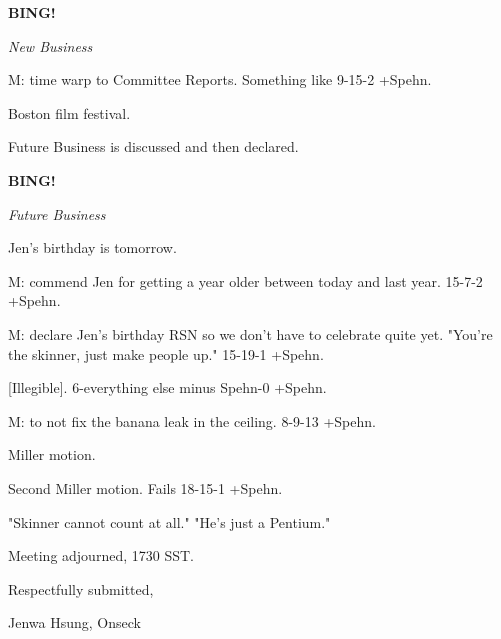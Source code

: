 \documentclass[12pt]{article}
\newcommand{\bing}{{\bf BING!} }
\newcommand{\goto}[1]{\bing \vskip 12pt \centerline{{\em{#1}}}}
\begin{document}
\goto{New Business}

M: time warp to Committee Reports. Something like 9-15-2 +Spehn.

Boston film festival.

Future Business is discussed and then declared.

\goto{Future Business}

Jen's birthday is tomorrow.

M: commend Jen for getting a year older between today and last year. 15-7-2 +Spehn.

M: declare Jen's birthday RSN so we don't have to celebrate quite yet. "You're the skinner, just make people up." 15-19-1 +Spehn.

[Illegible]. 6-everything else minus Spehn-0 +Spehn.

M: to not fix the banana leak in the ceiling. 8-9-13 +Spehn.

Miller motion.

Second Miller motion. Fails 18-15-1 +Spehn.

"Skinner cannot count at all." "He's just a Pentium."

\vspace{12pt}

\noindent
Meeting adjourned, 1730 SST.

\vspace{18pt}

\centerline{Respectfully submitted,}
\centerline{Jenwa Hsung, Onseck}
\end{document}
